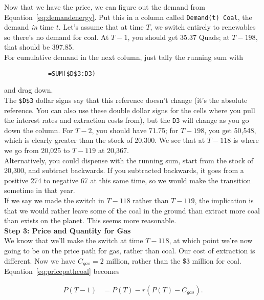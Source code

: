 \begin{enumerate}
\begin{Exercise}
\begin{sol}
        Now that we have the price, we can figure out the demand from Equation~\eqref{eq:demandenergy}. Put this in a column called \texttt{Demand(t) Coal}, the demand \textit{in} time $t$. Let's assume that at time $T$, we switch entirely to renewables so there's no demand for coal. At $T-1$, you should get  35.37 Quads; at $T-198$, that should be 397.85.\\
        
        For cumulative demand in the next column, just tally the running sum with
        
        \begin{verbatim}
            =SUM($D$3:D3)
        \end{verbatim}
        and drag down.\\
        
        The \texttt{\$D\$3} dollar signs say that this reference doesn't change (it's the absolute reference. You can also use these double dollar signs for the cells where you pull the interest rates and extraction costs from), but the \texttt{D3} will change as you go down the column. For $T-2$, you should have 71.75; for $T-198$, you get 50,548, which is clearly greater than the stock of 20,300. We see that at $T-118$ is where we go from 20,025 to $T-119$ at 20,367.\\
        
        Alternatively, you could dispense with the running sum, start from the stock of 20,300, and subtract backwards. If you subtracted backwards, it goes from a positive 274 to negative 67 at this same time, so we would make the transition sometime in that year.\\
        
        If we say we made the switch in $T-118$ rather than $T-119$, the implication is that we would rather leave some of the coal in the ground than extract more coal than exists on the planet. This seems more reasonable. \\
        
        \textbf{Step 3: Price and Quantity for Gas}\\
        
        We know that we'll make the switch at time $T-118$, at which point we're now going to be on the price path for gas, rather than coal. Our cost of extraction is different. Now we have $C_{gas}=2$ million, rather than the \$3 million for coal. Equation~\eqref{eq:pricepathcoal} becomes
        
        \begin{equation}
            \begin{split}
            P(T-1) & = P(T)-r(P(T)-C_{gas}).
            \end{split}
            \label{eq:pricepathgas}
        \end{equation}       
        

\end{sol}
\end{Exercise}
\end{enumerate}
